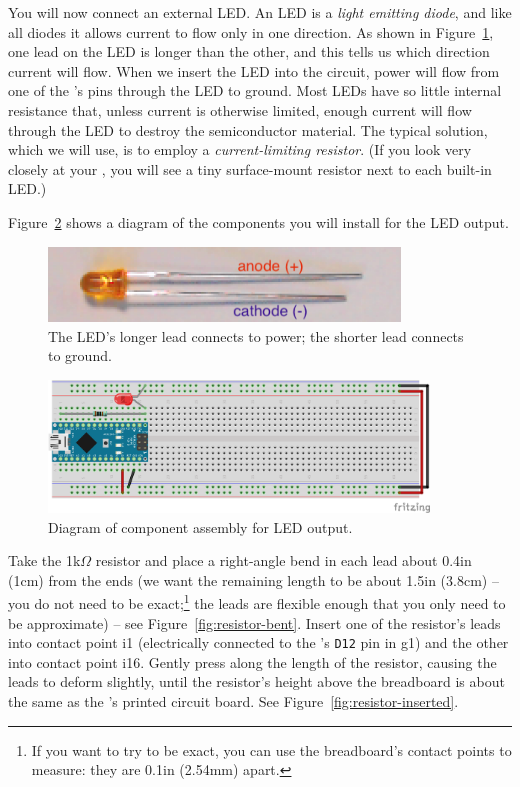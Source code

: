 You will now connect an external LED. An LED is a \textit{light emitting diode}, and like all diodes it allows current to flow only in one direction.
As shown in Figure~\ref{fig:led-annotated}, one lead on the LED is longer than the other, and this tells us which direction current will flow.
When we insert the LED into the circuit, power will flow from one of the \developmentboard's pins through the LED to ground.
Most LEDs have so little internal resistance that, unless current is otherwise limited, enough current will flow through the LED to destroy the semiconductor material.
The typical solution, which we will use, is to employ a \textit{current-limiting resistor}.
(If you look very closely at your \developmentboard, you will see a tiny surface-mount resistor next to each built-in LED.)

Figure~\ref{fig:led-diagram} shows a diagram of the components you will install for the LED output.

\begin{figure}
    \centering
    \includegraphics[height=2cm]{direct/led/led-annotated}
    \caption{The LED's longer lead connects to power; the shorter lead connects to ground.\label{fig:led-annotated}}
\end{figure}

\begin{figure}
    \centering
    \includegraphics[width=0.9\textwidth]{fritzing_diagrams/led}
    \caption{Diagram of component assembly for LED output. \label{fig:led-diagram}}
\end{figure}

Take the 1k$\Omega$ resistor and place a right-angle bend in each lead about 0.4in (1cm) from the ends (we want the remaining length to be about 1.5in (3.8cm) -- you do not need to be exact;\footnote{If you want to try to be exact, you can use the breadboard's contact points to measure: they are 0.1in (2.54mm) apart.}
the leads are flexible enough that you only need to be approximate) -- see Figure~\ref{fig:resistor-bent}.
Insert one of the resistor's leads into contact point i1 (electrically connected to the \developmentboard's \texttt{D12} pin in g1) and the other into contact point i16.
Gently press along the length of the resistor, causing the leads to deform slightly, until the resistor's height above the breadboard is about the same as the \developmentboard's printed circuit board.
See Figure~\ref{fig:resistor-inserted}.

